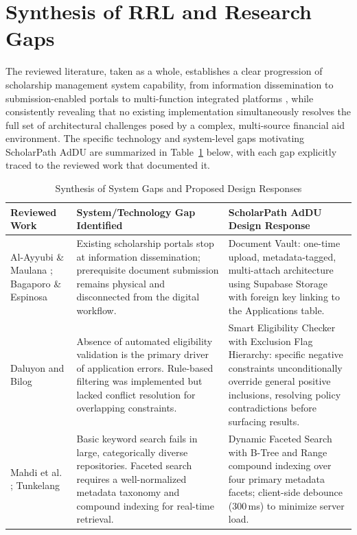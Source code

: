 \section{Synthesis of RRL and Research Gaps}

The reviewed literature, taken as a whole, establishes a clear progression of scholarship management system capability, from information dissemination \cite{ref12} to submission-enabled portals \cite{ref3,ref14} to multi-function integrated platforms \cite{ref5}, while consistently revealing that no existing implementation simultaneously resolves the full set of architectural challenges posed by a complex, multi-source financial aid environment. The specific technology and system-level gaps motivating ScholarPath AdDU are summarized in Table~\ref{tab:synthesis} below, with each gap explicitly traced to the reviewed work that documented it. \begin{table}[htbp]
  \centering
  \small
  \caption{Synthesis of System Gaps and Proposed Design Responses}
  \label{tab:synthesis}
  \begin{tabular}{@{}p{3.0cm} p{5.4cm} p{5.4cm}@{}}
    \toprule
    Reviewed Work & System/Technology Gap Identified & ScholarPath AdDU Design Response \\
    \midrule
    Al-Ayyubi \& Maulana \cite{ref3}; Bagaporo \& Espinosa \cite{ref12} & Existing scholarship portals stop at information dissemination; prerequisite document submission remains physical and disconnected from the digital workflow. & Document Vault: one-time upload, metadata-tagged, multi-attach architecture using Supabase Storage with foreign key linking to the Applications table. \\
    \addlinespace
    Daluyon and Bilog \cite{ref14} & Absence of automated eligibility validation is the primary driver of application errors. Rule-based filtering was implemented but lacked conflict resolution for overlapping constraints. & Smart Eligibility Checker with Exclusion Flag Hierarchy: specific negative constraints unconditionally override general positive inclusions, resolving policy contradictions before surfacing results. \\
    \addlinespace
    Mahdi et al. \cite{ref4}; Tunkelang \cite{ref43} & Basic keyword search fails in large, categorically diverse repositories. Faceted search requires a well-normalized metadata taxonomy and compound indexing for real-time retrieval. & Dynamic Faceted Search with B-Tree and Range compound indexing over four primary metadata facets; client-side debounce (300\,ms) to minimize server load. \\

\end{tabular}
\end{table}
